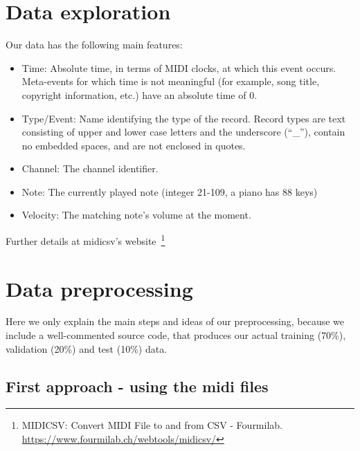 \documentclass{article}
\begin{document}
\section{Data exploration}
\label{sec:exploration}
Our data has the following main features:
\begin{itemize}
	\item Time: Absolute time, in terms of MIDI clocks, at which this event occurs. Meta-events
	for which time is not meaningful (for example, song title, copyright information, etc.)
	have an absolute time of 0.
	\item Type/Event: Name identifying the type of the record. Record types are text consisting
	of upper and lower case letters and the underscore (``\_''), contain no embedded
	spaces, and are not enclosed in quotes.
	\item Channel: The channel identifier.
	\item Note: The currently played note (integer 21-109, a piano has 88 keys)
	\item Velocity: The matching note’s volume at the moment.
\end{itemize}
Further details at midicsv’s website~\footnote{MIDICSV: Convert MIDI File to and from CSV - Fourmilab. \url{https://www.fourmilab.ch/webtools/midicsv/}}

\section{Data preprocessing}
\label{sec:prepoc}
Here we only explain the main steps and ideas of our preprocessing, because we include a well-commented source code, that produces our actual training (70\%), validation (20\%) and test (10\%) data.

\subsection{First approach - using the midi files}
\end{document}
